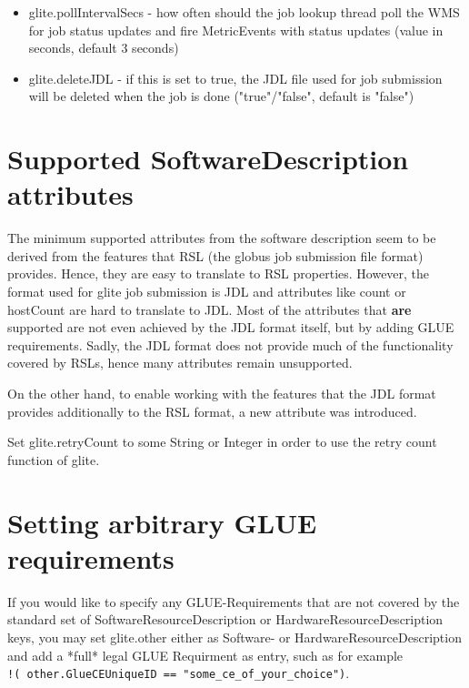 \documentclass{scrreprt}
\begin{document}
\begin{itemize}
 \item glite.pollIntervalSecs - how often should the job lookup thread poll the WMS for job status updates and fire MetricEvents with status updates (value in seconds, default 3 seconds)
 \item glite.deleteJDL - if this is set to true, the JDL file used for job submission will be deleted when the job is done ("true"/"false", default is "false")
\end{itemize}

\section{Supported SoftwareDescription attributes}

The minimum supported attributes from the software description seem to be derived from the features
that RSL (the globus job submission file format) provides. Hence, they are easy to translate to RSL 
properties.
However, the format used for glite job submission is JDL and attributes like count or hostCount are
hard to translate to JDL. Most of the attributes that \textbf{are} supported are not even achieved by the JDL
format itself, but by adding GLUE requirements.
Sadly, the JDL format does not provide much of the functionality covered by RSLs, hence many attributes
remain unsupported.
 
On the other hand, to enable working with the features that the JDL format provides additionally to
the RSL format, a new attribute was introduced.
 
Set glite.retryCount to some String or Integer in order to use the retry count function of glite.

\section{Setting arbitrary GLUE requirements}

If you would like to specify any GLUE-Requirements that are not covered by the standard set of 
SoftwareResourceDescription or HardwareResourceDescription keys, you may set glite.other either as
Software- or HardwareResourceDescription and add a *full* legal GLUE Requirment as entry, such as
for example \\ \verb+!( other.GlueCEUniqueID == "some_ce_of_your_choice")+.
\end{document}
